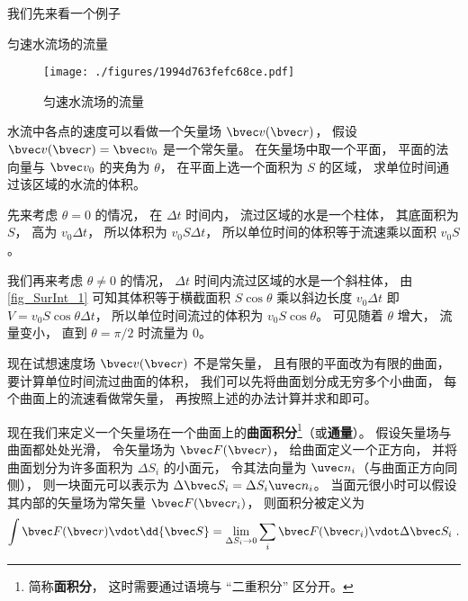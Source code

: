 

我们先来看一个例子

\begin{example}{匀速水流场的流量}\label{ex_SurInt_1}

\begin{figure}[ht]
\centering
\texttt{[image: ./figures/1994d763fefc68ce.pdf]}
\caption{匀速水流场的流量} \label{fig_SurInt_1}
\end{figure}

水流中各点的速度可以看做一个矢量场 $\bvec v(\bvec r)$， 假设 $\bvec v(\bvec r) = \bvec v_0$ 是一个常矢量。 在矢量场中取一个平面， 平面的法向量与 $\bvec v_0$ 的夹角为 $\theta$， 在平面上选一个面积为 $S$ 的区域， 求单位时间通过该区域的水流的体积。

先来考虑 $\theta = 0$ 的情况， 在 $\Delta t$ 时间内， 流过区域的水是一个柱体， 其底面积为 $S$， 高为 $v_0\Delta t$， 所以体积为 $v_0 S\Delta t$， 所以单位时间的体积等于流速乘以面积 $v_0 S$。

我们再来考虑 $\theta \ne 0$ 的情况， $\Delta t$ 时间内流过区域的水是一个斜柱体， 由\autoref{fig_SurInt_1} 可知其体积等于横截面积 $S\cos\theta$ 乘以斜边长度 $v_0\Delta t$ 即 $V = v_0 S\cos\theta\Delta t$， 所以单位时间流过的体积为 $v_0 S\cos\theta$。 可见随着 $\theta$ 增大， 流量变小， 直到 $\theta = \pi/2$ 时流量为 $0$。

现在试想速度场 $\bvec v(\bvec r)$ 不是常矢量， 且有限的平面改为有限的曲面， 要计算单位时间流过曲面的体积， 我们可以先将曲面划分成无穷多个小曲面， 每个曲面上的流速看做常矢量， 再按照上述的办法计算并求和即可。
\end{example}

现在我们来定义一个矢量场在一个曲面上的\textbf{曲面积分}\footnote{简称\textbf{面积分}， 这时需要通过语境与 “二重积分” 区分开。}（或\textbf{通量}）。 假设矢量场与曲面都处处光滑， 令矢量场为 $\bvec F(\bvec r)$， 给曲面定义一个正方向， 并将曲面划分为许多面积为 $\Delta S_i$ 的小面元， 令其法向量为 $\uvec n_i$（与曲面正方向同侧）， 则一块面元可以表示为 $\Delta \bvec S_i = \Delta S_i \uvec n_i$。 当面元很小时可以假设其内部的矢量场为常矢量 $\bvec F(\bvec r_i)$， 则面积分被定义为
\begin{equation}\label{eq_SurInt_1}
\int \bvec F(\bvec r) \vdot \dd{\bvec S} = \lim_{\Delta S_i\to 0} \sum_i \bvec F(\bvec r_i) \vdot \Delta \bvec S_i~.
\end{equation}

